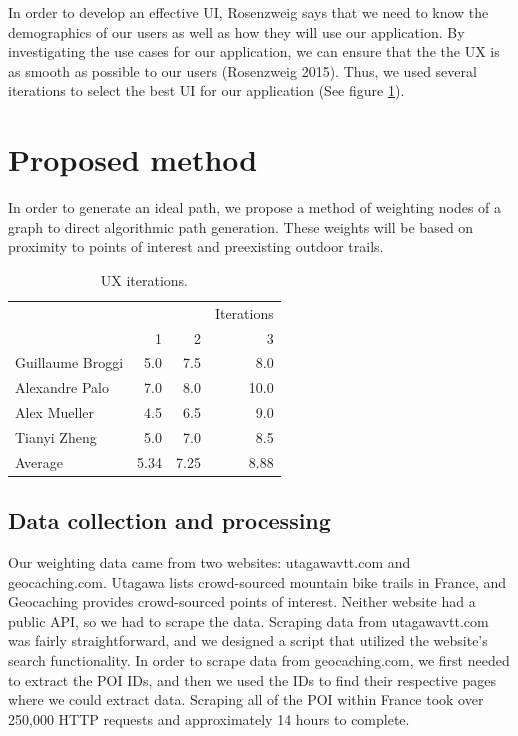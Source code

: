 \documentclass[sigconf]{acmart}
\begin{document}
In order to develop an effective UI, Rosenzweig says that we need to know the demographics of our users as well as how they will use our application. By investigating the use cases for our application, we can ensure that the the UX is as smooth as possible to our users (Rosenzweig 2015). Thus, we used several iterations to select the best UI for our application (See figure \ref{table:ux_iterations}).

\section{Proposed method}
In order to generate an ideal path, we propose a method of weighting nodes of a graph to direct algorithmic path generation. These weights will be based on proximity to points of interest and preexisting outdoor trails.

\begin{table}
    \begin{tabular}{|lrrr|}
         \hline
         & & & Iterations \\
         & 1 & 2 & 3 \\
         \hline
         Guillaume Broggi & 5.0 & 7.5 & 8.0
         \\
         Alexandre Palo & 7.0 & 8.0 & 10.0
         \\
       	 Alex Mueller & 4.5 & 6.5 & 9.0
       	 \\
       	 Tianyi Zheng & 5.0 & 7.0 & 8.5
       	 \\
         \hline
         Average & 5.34 & 7.25 & 8.88
         \\
         \hline
    \end{tabular}
    \captionsetup{justification=centering}
    \caption{UX iterations.}
    \label{table:ux_iterations}
\end{table}

\subsection{Data collection and processing}
Our weighting data came from two websites: utagawavtt.com and geocaching.com. Utagawa lists crowd-sourced mountain bike trails in France, and Geocaching provides crowd-sourced points of interest. Neither website had a public API, so we had to scrape the data. Scraping data from utagawavtt.com was fairly straightforward, and we designed a script that utilized the website's search functionality. In order to scrape data from geocaching.com, we first needed to extract the POI IDs, and then we used the IDs to find their respective pages where we could extract data. Scraping all of the POI within France took over 250,000 HTTP requests and approximately 14 hours to complete.
\end{document}
